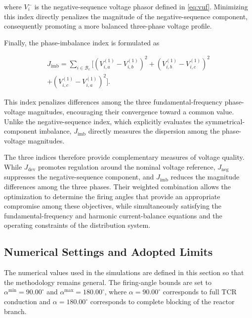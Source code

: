 \documentclass[journal]{IEEEtran}
\begin{document}
where $V_i^{-}$ is the negative-sequence voltage phasor defined in
\eqref{eq:vuf}. Minimizing this index directly penalizes the magnitude
of the negative-sequence component, consequently promoting a more
balanced three-phase voltage profile.

Finally, the phase-imbalance index is formulated as

\begin{equation}
\begin{aligned}
    J_{\mathrm{imb}} =
    \sum_{i\in\mathcal{B}_c}
    \bigl[
    \left(V_{i,a}^{(1)}-V_{i,b}^{(1)}\right)^2
    +\left(V_{i,b}^{(1)}-V_{i,c}^{(1)}\right)^2 \\
    +\left(V_{i,c}^{(1)}-V_{i,a}^{(1)}\right)^2
    \bigr].
\end{aligned}
    \label{eq:obj_imb}
\end{equation}


This index penalizes differences among the three fundamental-frequency
phase-voltage magnitudes, encouraging their convergence toward a common
value. Unlike the negative-sequence index, which explicitly evaluates
the symmetrical-component imbalance, $J_{\mathrm{imb}}$ directly
measures the dispersion among the phase-voltage magnitudes.

The three indices therefore provide complementary measures of
voltage quality. While $J_{\mathrm{dev}}$ promotes regulation around
the nominal voltage reference, $J_{\mathrm{neg}}$ suppresses the
negative-sequence component, and $J_{\mathrm{imb}}$ reduces the
magnitude differences among the three phases. Their weighted
combination allows the optimization to determine the firing angles
that provide an appropriate compromise among these objectives,
while simultaneously satisfying the fundamental-frequency and
harmonic current-balance equations and the operating constraints
of the distribution system.





\subsection{Numerical Settings and Adopted Limits}
\label{subsec:numerical_settings}

The numerical values used in the simulations are defined in this section so
that the methodology remains general. The firing-angle bounds are set to
$\alpha^{\min}=90.00^\circ$ and $\alpha^{\max}=180.00^\circ$, where
$\alpha=90.00^\circ$ corresponds to full TCR conduction and
$\alpha=180.00^\circ$ corresponds to complete blocking of the reactor branch.
\end{document}
